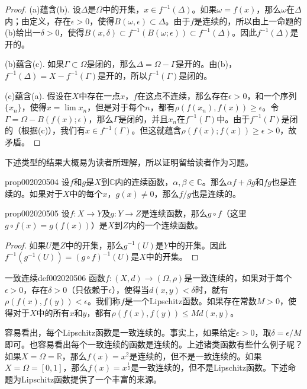 \begin{proof}
(a)蕴含(b). 设$\Delta$是$\Omega$中的开集，$x \in f^{-1}(\Delta)$。如果$\omega = f(x)$，那么$\omega$在$\Delta$内；由定义，存在$\epsilon > 0$，使得$B(\omega, \epsilon) \subset \Delta$。由于$f$是连续的，所以由上一命题的(b)给出一$\delta > 0$，使得$B(x, \delta) \subset f^{-1}(B(\omega; \epsilon)) \subset f^{-1}(\Delta)$。因此$f^{-1}(\Delta)$是开的。

(b)蕴含(c). 如果$\Gamma \subset \Omega$是闭的，那么$\Delta = \Omega - \Gamma$是开的。由(b)，$f^{-1}(\Delta) = X - f^{-1}(\Gamma)$是开的，所以$f^{-1}(\Gamma)$是闭的。

(c)蕴含(a). 假设在$X$中存在一点$x$，$f$在这点不连续，那么存在$\epsilon > 0$，和一个序列$\{x_n\}$，使得$x = \lim{x_n}$，但是对于每个$n$，都有$\rho(f(x_n), f(x)) \ge \epsilon$。令$\Gamma = \Omega - B(f(x); \epsilon)$，那么$\Gamma$是闭的，并且$x_n$在$f^{-1}(\Gamma)$中。由于$f^{-1}(\Gamma)$是闭的（根据(c)），我们有$x \in f^{-1}(\Gamma)$。但这就蕴含$\rho(f(x);f(x)) \ge \epsilon > 0$，故矛盾。
\end{proof}

下述类型的结果大概易为读者所理解，所以证明留给读者作为习题。
\begin{proposition}{}{prop002020504}
设$f$和$g$是$X$到$\mathbb{C}$内的连续函数，$\alpha, \beta \in \mathbb{C}$。那么$\alpha{}f + \beta{}g$和$fg$也是连续的。如果对于$X$中的每个$x$，$g(x) \neq 0$，那么$f/g$也是连续的。
\end{proposition}

\begin{proposition}{}{prop002020505}
设$f: X \to Y$及$g:Y \to Z$是连续函数，那么$g \circ f$（这里$g \circ f(x) = g(f(x))$）是$X$到$Z$内的一个连续函数。
\end{proposition}

\begin{proof}
如果$U$是$Z$中的开集，那么$g^{-1}(U)$是$Y$中的开集。因此$f^{-1}(g^{-1}(U))=(g \circ f)^{-1}(U)$是$X$中的开集。
\end{proof}

\begin{definition}{一致连续}{def002020506}
函数$f:(X, d) \to (\Omega, \rho)$是一致连续的，如果对于每个$\epsilon > 0$，存在$\delta > 0$（只依赖于$\epsilon$），使得当$d(x, y) < \delta$时，就有$\rho(f(x), f(y)) < \epsilon$。我们称$f$是一个Lipschitz函数。如果存在常数$M > 0$，使得对于$X$中的所有$x$和$y$，都有$\rho(f(x), f(y)) \le Md(x, y)$。
\end{definition}

容易看出，每个Lipschitz函数是一致连续的。事实上，如果给定$\epsilon > 0$，取$\delta = \epsilon / M$即可。也容易看出每个一致连续的函数是连续的。上述诸类函数有些什么例子呢？如果$X = \Omega = \mathbb{R}$，那么$f(x)=x^2$是连续的，但不是一致连续的。如果$X = \Omega = [0,1]$，那么$f(x) = x^{\frac{1}{2}}$是一致连续的，但不是Lipschitz函数。下述命题为Lipschitz函数提供了一个丰富的来源。

